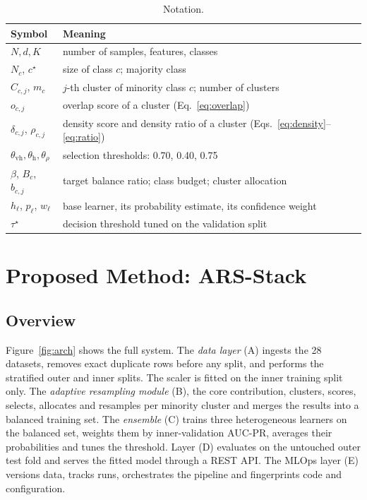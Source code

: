 \documentclass[11pt,a4paper]{article}
\begin{document}
\begin{table}[t]\centering\small
\caption{Notation.}\label{tab:notation}
\begin{tabular}{ll}
\toprule
Symbol & Meaning \\
\midrule
$N, d, K$ & number of samples, features, classes \\
$N_c$, $c^\star$ & size of class $c$; majority class \\
$C_{c,j}$, $m_c$ & $j$-th cluster of minority class $c$; number of clusters \\
$o_{c,j}$ & overlap score of a cluster (Eq.~\ref{eq:overlap}) \\
$\delta_{c,j}$, $\rho_{c,j}$ & density score and density ratio of a cluster (Eqs.~\ref{eq:density}--\ref{eq:ratio}) \\
$\theta_{\mathrm{vh}},\theta_{\mathrm{h}},\theta_{\rho}$ & selection thresholds: 0.70, 0.40, 0.75 \\
$\beta$, $B_c$, $b_{c,j}$ & target balance ratio; class budget; cluster allocation \\
$h_\ell$, $p_\ell$, $w_\ell$ & base learner, its probability estimate, its confidence weight \\
$\tau^\star$ & decision threshold tuned on the validation split \\
\bottomrule
\end{tabular}
\end{table}

\section{Proposed Method: ARS-Stack}\label{sec:method}

\subsection{Overview}

Figure~\ref{fig:arch} shows the full system. The \emph{data layer} (A) ingests the 28 datasets, removes exact duplicate rows before any split, and performs the stratified outer and inner splits. The scaler is fitted on the inner training split only. The \emph{adaptive resampling module} (B), the core contribution, clusters, scores, selects, allocates and resamples per minority cluster and merges the results into a balanced training set. The \emph{ensemble} (C) trains three heterogeneous learners on the balanced set, weights them by inner-validation AUC-PR, averages their probabilities and tunes the threshold. Layer (D) evaluates on the untouched outer test fold and serves the fitted model through a REST API. The MLOps layer (E) versions data, tracks runs, orchestrates the pipeline and fingerprints code and configuration.
\end{document}
